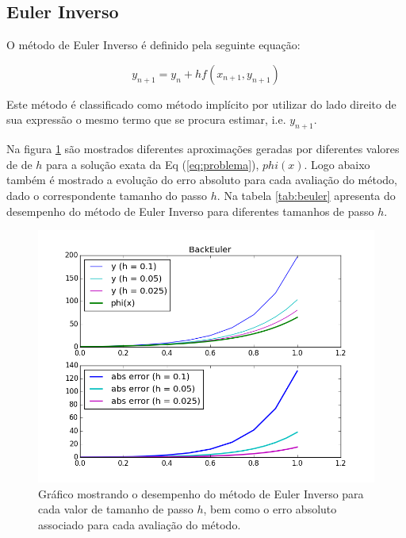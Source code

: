 \documentclass[a4paper]{article}
\begin{document}
\pagebreak 





\subsection{Euler Inverso}

O método de Euler Inverso é definido pela seguinte equação:

\begin{equation}
y_{n+1} = y_{n} + hf(x_{n+1},y_{n+1})
\end{equation}

Este método é classificado como método implícito por utilizar do lado direito de sua expressão o mesmo termo que se procura estimar, i.e. $y_{n+1}$.


Na figura \ref{fig:beuler} são mostrados diferentes aproximações geradas por diferentes valores de de $h$ para a solução exata da Eq (\ref{eq:problema}), $phi(x)$. Logo abaixo também é mostrado a evolução do erro absoluto para cada avaliação do método, dado o correspondente tamanho do passo $h$. Na tabela \ref{tab:beuler} apresenta do desempenho do método de Euler Inverso para diferentes tamanhos de passo $h$.



\begin{figure}[!h]
\centering
\includegraphics[width=1.0\textwidth]{plots/BackEuler.png}
\caption{\label{fig:beuler}Gráfico mostrando o desempenho do método de Euler Inverso para cada valor de tamanho de passo $h$, bem como o erro absoluto associado para cada avaliação do método.}
\end{figure}
\end{document}
